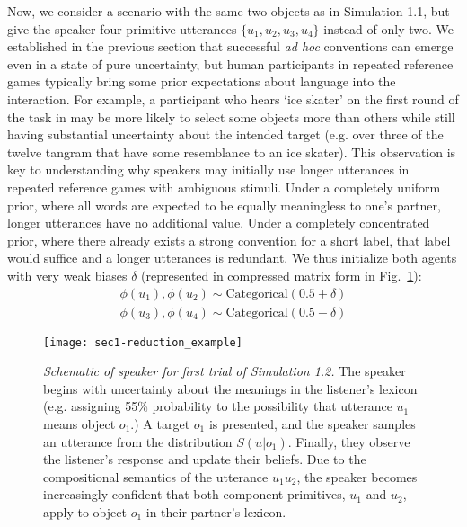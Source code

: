 Now, we consider a scenario with the same two objects as in Simulation 1.1, but give the speaker four primitive utterances $\{u_1, u_2, u_3, u_4\}$ instead of only two. 
We established in the previous section that successful \emph{ad hoc} conventions can emerge even in a state of pure uncertainty, but human participants in repeated reference games typically bring some prior expectations about language into the interaction.
For example, a participant who hears `ice skater' on the first round of the task in  may be more likely to select some objects more than others while still having substantial uncertainty about the intended target (e.g. over three of the twelve tangram that have some resemblance to an ice skater).
This observation is key to understanding why speakers may initially use longer utterances in repeated reference games with ambiguous stimuli. 
Under a completely uniform prior, where all words are expected to be equally meaningless to one's partner, longer utterances have no additional value. 
Under a completely concentrated prior, where there already exists a strong convention for a short label, that label would suffice and a longer utterances is redundant.
We thus initialize both agents with very weak biases $\delta$ (represented in compressed matrix form in Fig.~\ref{fig:sec1efficiency}):
\begin{align}
\phi(u_1), \phi(u_2) \sim \textrm{Categorical}(0.5 + \delta) \nonumber\\
\phi(u_3), \phi(u_4) \sim \textrm{Categorical}(0.5 - \delta) \nonumber
\end{align}

\begin{figure}
\centering
    \texttt{[image: sec1-reduction\_example]}
    \vspace{1em}
  \caption{\emph{Schematic of speaker for first trial of Simulation 1.2.} The speaker begins with uncertainty about the meanings in the listener's lexicon (e.g. assigning 55\% probability to the possibility that utterance $u_1$ means object $o_1$.) A target $o_1$ is presented, and the speaker samples an utterance from the distribution $S(u|o_1)$. Finally, they observe the listener's response and update their beliefs. Due to the compositional semantics of the utterance $u_1u_2$, the speaker becomes increasingly confident that both component primitives, $u_1$ and $u_2$, apply to object $o_1$ in their partner's lexicon.}
  \label{fig:sec1efficiency}
\end{figure}

